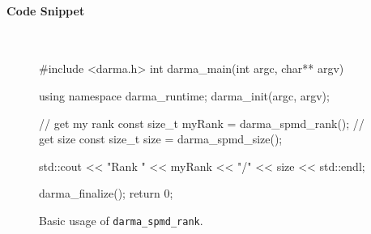 \paragraph{Code Snippet}\mbox{}\\ 
\begin{figure}[!h]
\begin{CppCodeNumb}
#include <darma.h>
int darma_main(int argc, char** argv)
{
  using namespace darma_runtime;
  darma_init(argc, argv);

  // get my rank
  const size_t myRank = darma_spmd_rank();
  // get size 
  const size_t size = darma_spmd_size();

  std::cout << "Rank " << myRank << "/" << size << std::endl;

  darma_finalize();
  return 0;
}
\end{CppCodeNumb}
\label{fig:fe_api_ranksize}
\caption{Basic usage of \texttt{darma\_spmd\_rank}.}
\end{figure}


